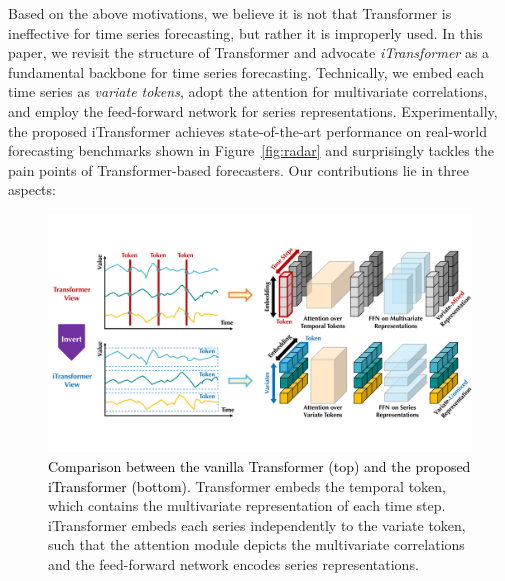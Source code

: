\documentclass[twoside,12pt]{article}
\newcommand{\update}[1]{{\textcolor{black}{#1}}}
\begin{document}
Based on the above motivations, we believe it is not that Transformer is ineffective for time series forecasting, but rather it is improperly used. In this paper, we revisit the structure of Transformer and advocate \emph{iTransformer} as a fundamental backbone for time series forecasting. Technically, we embed each time series as \emph{variate tokens}, adopt the attention for multivariate correlations, and employ the feed-forward network for series representations. Experimentally, the proposed iTransformer achieves state-of-the-art performance on real-world forecasting benchmarks shown in Figure~\ref{fig:radar} and surprisingly tackles the pain points of  Transformer-based forecasters. Our contributions lie in three aspects:


\begin{figure}[t]
  \begin{center}
    \includegraphics[width=0.95\columnwidth]{pic/motivation.pdf}
    \vspace{-10pt}
    \caption{\small{\update{Comparison between the vanilla Transformer (top) and the proposed iTransformer (bottom).} Transformer embeds the temporal token, which contains the multivariate representation of each time step. iTransformer embeds each series independently to the variate token, such that the attention module depicts the multivariate correlations and the feed-forward network encodes series representations.}}
    \label{fig:motivation}
  \end{center}
  \vspace{-14pt}
\end{figure}
\end{document}
